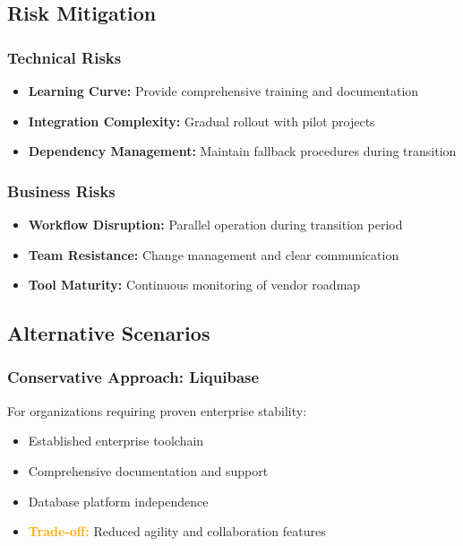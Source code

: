 \subsection{Risk Mitigation}

\subsubsection{Technical Risks}
\begin{itemize}
    \item \textbf{Learning Curve:} Provide comprehensive training and documentation
    \item \textbf{Integration Complexity:} Gradual rollout with pilot projects
    \item \textbf{Dependency Management:} Maintain fallback procedures during transition
\end{itemize}

\subsubsection{Business Risks}
\begin{itemize}
    \item \textbf{Workflow Disruption:} Parallel operation during transition period
    \item \textbf{Team Resistance:} Change management and clear communication
    \item \textbf{Tool Maturity:} Continuous monitoring of vendor roadmap
\end{itemize}

\subsection{Alternative Scenarios}

\subsubsection{Conservative Approach: Liquibase}
For organizations requiring proven enterprise stability:
\begin{itemize}
    \item Established enterprise toolchain
    \item Comprehensive documentation and support
    \item Database platform independence
    \item \textcolor{orange}{\textbf{Trade-off:}} Reduced agility and collaboration features
\end{itemize}

